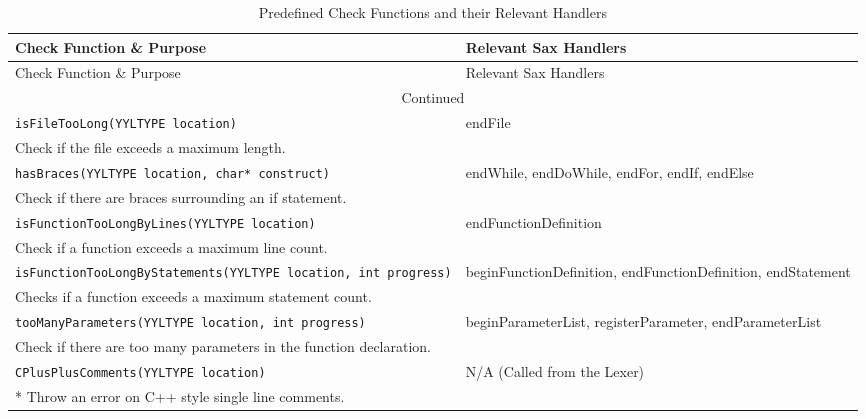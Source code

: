 \documentclass[12pt]{report}
\begin{document}
\begin{longtable}{p{10cm} p{\saxColSize}}
 \caption{Predefined Check Functions and their Relevant Handlers}
 \label{predefinedChecksFunctions} \\
\toprule
Check Function \& Purpose & Relevant Sax Handlers \\ \midrule
\endfirsthead
\toprule
Check Function \& Purpose & Relevant Sax Handlers \\ \midrule
\endhead
\hline
\multicolumn{2}{c}{Continued}\\
\bottomrule
\endfoot
\bottomrule
\endlastfoot

		\lstinline!isFileTooLong(YYLTYPE location)! & \multirow{2}{\saxColSize}{endFile} \\*
			 Check if the file exceeds a maximum length.  \vspace{\vertSize} \\
		\lstinline!hasBraces(YYLTYPE location, char* construct)! & \multirow{2}{\saxColSize}{endWhile, endDoWhile, endFor, endIf, endElse} \\*
			 Check if there are braces surrounding an if statement. \vspace{\vertSize} \\
		\lstinline!isFunctionTooLongByLines(YYLTYPE location)! & \multirow{2}{\saxColSize}{endFunctionDefinition} \\*
			 Check if a function exceeds a maximum line count. \vspace{\vertSize} \\
		\lstinline!isFunctionTooLongByStatements(YYLTYPE location, int progress)! & \multirow{2}{\saxColSize}{beginFunctionDefinition, endFunctionDefinition, endStatement} \\*
			 Checks if a function exceeds a maximum statement count. \vspace{\vertSize} \\
		\lstinline!tooManyParameters(YYLTYPE location, int progress)! & \multirow{2}{\saxColSize}{beginParameterList, registerParameter, endParameterList} \\*
			 Check if there are too many parameters in the function declaration. \vspace{\vertSize} \\
		\lstinline!CPlusPlusComments(YYLTYPE location)! & \multirow{2}{\saxColSize}{N/A (Called from the Lexer)} \\ *
		Throw an error on C++ style single line comments. \vspace{\vertSize} \\

\end{longtable}
\end{document}
